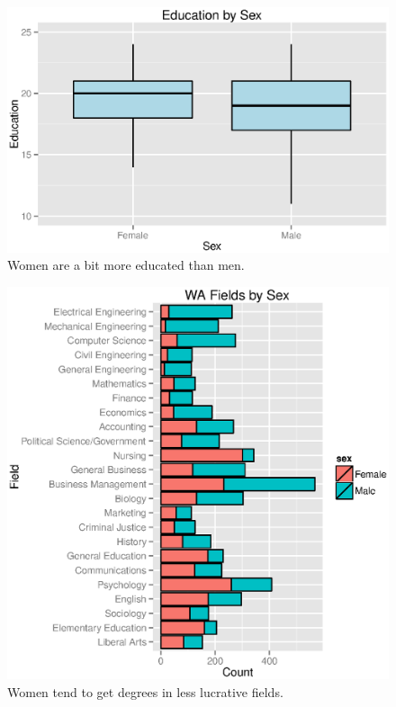 \documentclass{exam}
\begin{document}
  \begin{figure}[H]
    \centering
    \includegraphics[scale = 0.8]{figures/wa_education_by_sex.eps}
    \caption{Women are a bit more educated than men.}
  \end{figure}

  \begin{figure}[H]
    \centering
    \includegraphics{figures/wa_field_by_sex.eps}
    \caption{ Women tend to get degrees in less lucrative fields.}
  \end{figure}
\end{document}
